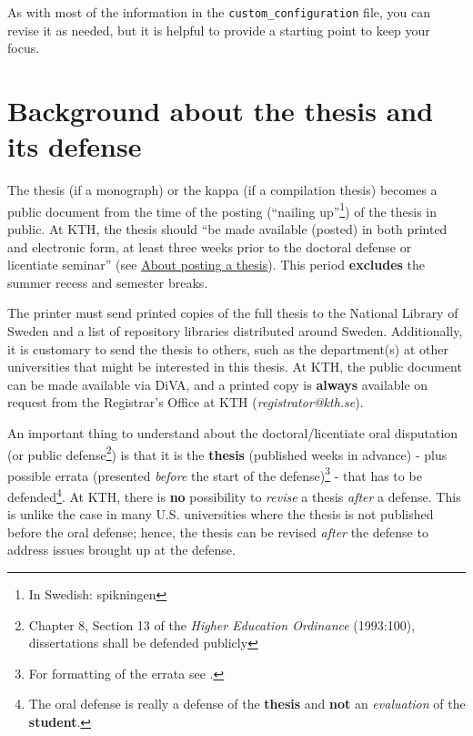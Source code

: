 \documentclass[12pt, twoside]{article}
\newif\ifinswedish
\begin{document}
\FloatBarrier

As with most of the information in the \texttt{custom\_configuration} file, you can revise it as needed, but it is helpful to provide a starting point to keep your focus.
\clearpage


\section{Background about the thesis and its defense}
\label{sec:cycle3BackgroundOfThesisAndDefense}
The thesis (if a monograph) or the kappa (if a compilation thesis) becomes a public document from the time of the posting (\enquote{nailing up}\footnote{\foreignlanguage{swedish}{In Swedish: spikningen}}) of the thesis in public. At \gls{KTH}, the thesis should \enquote{be made available (posted) in both printed and electronic form, at least three weeks prior to the doctoral defense or licentiate seminar} (see \href{https://www.kth.se/en/biblioteket/publicera-analysera/hantera-publikationer/om-att-spika-avhandling-1.854781}{About posting a thesis}). This period \textbf{excludes} the summer recess and semester breaks.

The printer must send printed copies of the full thesis to the National Library of Sweden and a list of repository libraries distributed around Sweden. Additionally, it is customary to send the thesis to others, such as the department(s) at other universities that might be interested in this thesis. At \gls{KTH}, the public document can be made available via \gls{DiVA}, and a printed copy is \textbf{always} available on request from the Registrar’s Office at KTH (\textit{registrator@kth.se}).

An important thing to understand about the doctoral/licentiate oral disputation (or public defense\footnote{
\ifinswedish
\foreignlanguage{swedish}{8 kap. 13 § högskoleförordningen (1993:100) \enquote{skall disputationer försvaras offentligt}}
\else
Chapter 8, Section 13 of the \textit{Higher Education Ordinance} (1993:100), dissertations shall be defended publicly
\fi
}) is that it is the \textbf{thesis} (published weeks in advance) - plus possible errata (presented \textit {before} the start of the defense)\footnote{For formatting of the errata see .} - that has to be defended\footnote{The oral defense is really a defense of the \textbf{thesis} and \textbf{not} an \textit{evaluation} of the \textbf{student}.}. At \gls{KTH}, there is \textbf{no} possibility to \textit{revise} a thesis \textit{after} a defense. This is unlike the case in many U.S. universities where the thesis is not published before the oral defense; hence, the thesis can be revised \textit{after} the defense to address issues brought up at the defense.
\end{document}
